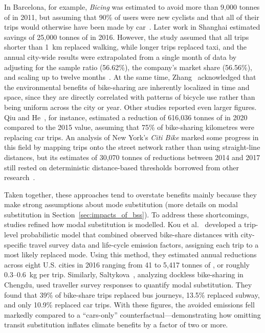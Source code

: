         In Barcelona, for example, \textit{Bicing} was estimated to avoid more than 9,000 tonnes of  in 2011, but assuming that 90\% of users were new cyclists and that all of their trips would otherwise have been made by car~\cite{Rojas-Rueda2011}. Later work in Shanghai estimated savings of 25,000 tonnes of  in 2016. However, the study assumed that all trips shorter than 1~km replaced walking, while longer trips replaced taxi, and the annual city-wide results were extrapolated from a single month of data by adjusting for the sample ratio (56.62\%), the company’s market share (56.56\%), and scaling up to twelve months~\cite{Zhang2018}. At the same time, Zhang~\cite{Zhang2018} acknowledged that the environmental benefits of bike-sharing are inherently localized in time and space, since they are directly correlated with patterns of bicycle use rather than being uniform across the city or year. Other studies reported even larger figures. Qiu and He~\cite{Qiu2018}, for instance, estimated a reduction of 616,036 tonnes of  in 2020 compared to the 2015 value, assuming that 75\% of bike-sharing kilometres were replacing car trips. An analysis of New York’s \textit{Citi Bike} marked some progress in this field by mapping trips onto the street network rather than using straight-line distances, but its estimates of 30,070 tonnes of  reductions between 2014 and 2017 still rested on deterministic distance-based thresholds borrowed from other research~\cite{Chen2022c}.

        Taken together, these approaches tend to overstate benefits mainly because they make strong assumptions about mode substitution (more details on modal substitution in Section~\ref{sec:impacts_of_bss}). To address these shortcomings, studies refined how modal substitution is modelled. Kou et al.~\cite{Kou2020} developed a trip-level probabilistic model that combined observed bike-share distances with city-specific travel survey data and life-cycle emission factors, assigning each trip to a most likely replaced mode. Using this method, they estimated annual reductions across eight U.S. cities in 2016 ranging from 41 to 5,417 tonnes of , or roughly 0.3--0.6~kg per trip. Similarly, Saltykova~\cite{Saltykova2022}, analyzing dockless bike-sharing in Chengdu, used traveller survey responses to quantify modal substitution. They found that 39\% of bike-share trips replaced bus journeys, 13.5\% replaced subway, and only 10.9\% replaced car trips. With these figures, the avoided emissions fell markedly compared to a “cars-only” counterfactual—demonstrating how omitting transit substitution inflates climate benefits by a factor of two or more.

